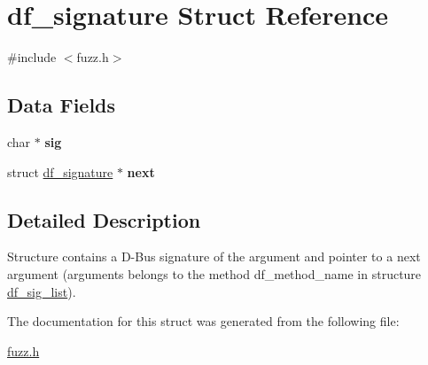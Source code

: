 \hypertarget{structdf__signature}{\section{df\-\_\-signature Struct Reference}
\label{structdf__signature}
}


{\ttfamily \#include $<$fuzz.\-h$>$}

\subsection*{Data Fields}
\begin{DoxyCompactItemize}
\item 
\hypertarget{structdf__signature_abb7a207b3e620da8ae646f0fd413d5a6}{char $\ast$ {\bfseries sig}}\label{structdf__signature_abb7a207b3e620da8ae646f0fd413d5a6}

\item 
\hypertarget{structdf__signature_a3a28431d4da1332475f90abb4e691207}{struct \hyperlink{structdf__signature}{df\-\_\-signature} $\ast$ {\bfseries next}}\label{structdf__signature_a3a28431d4da1332475f90abb4e691207}

\end{DoxyCompactItemize}


\subsection{Detailed Description}
Structure contains a D-\/\-Bus signature of the argument and pointer to a next argument (arguments belongs to the method df\-\_\-method\-\_\-name in structure \hyperlink{structdf__sig__list}{df\-\_\-sig\-\_\-list}). 

The documentation for this struct was generated from the following file\-:\begin{DoxyCompactItemize}
\item 
\hyperlink{fuzz_8h}{fuzz.\-h}\end{DoxyCompactItemize}
